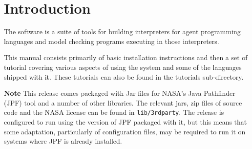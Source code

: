 \chapter{Introduction}

The \mcapl{} software is a suite of tools for building interpreters
for agent programming languages and  model checking programs
executing in those interpreters.  

This manual consists primarily of basic installation instructions and then a set of tutorial covering various aspects of using the system and some of the languages shipped with it.  These tutorials can also be found in the tutorials sub-directory.

{\bf Note} This release comes packaged with Jar files for NASA's Java Pathfinder (JPF) tool and a number of other libraries.  The relevant jars, zip files of source code and the NASA license can be found in \texttt{lib/3rdparty}.  The release is configured to run using the version of JPF packaged with it, but this means that some adaptation, particularly of configuration files, may be required to run it on systems where JPF is already installed.


